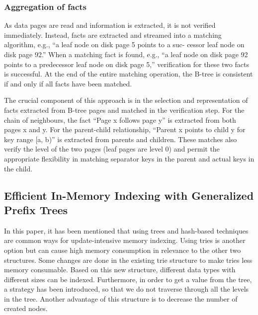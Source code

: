 \documentclass{report}
\begin{document}
\subsubsection{Aggregation of facts}

As data pages are read and information is extracted, it is not verified immediately. Instead, facts are extracted and streamed into a matching algorithm, e.g., “a leaf node on disk page 5 points to a suc-
cessor leaf node on disk page 92.” When a matching fact is found, e.g., “a leaf node on disk page 92 points to a predecessor leaf node on disk page 5,” verification for these two facts is successful. At the end of the entire matching operation, the B-tree is consistent if and only if all facts have been matched.

The crucial component of this approach is in the selection and representation of facts extracted from B-tree pages and matched in the verification step. For the chain of neighbours, the fact “Page x follows page y” is extracted from both pages x and y. For the parent-child relationship, “Parent x points to child y for key range [a, b)” is extracted
from parents and children. These matches also verify the level of the two pages (leaf pages are level 0) and permit the appropriate flexibility in matching separator keys in the parent and actual keys in the child.

\subsection{Efficient In-Memory Indexing with Generalized Prefix Trees \cite{Boehm}}

In this paper, it has been mentioned that using trees and hash-based techniques are common ways for update-intensive memory indexing. Using tries is another option but can cause high memory consumption in relevance to the other two structures. Some changes are done in the existing trie structure to make tries less memory consumable. Based on this new structure, different data types with different sizes can be indexed. Furthermore, in order to get a value from the tree, a strategy has been introduced, so that we do not traverse through all the levels in the tree. Another advantage of this structure is to decrease the number of created nodes. 
\end{document}
